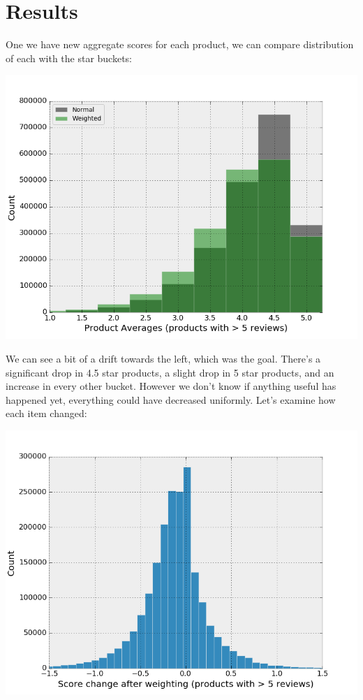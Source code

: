 \documentclass[a4paper,10pt]{article}
\begin{document}
\section*{Results}
One we have new aggregate scores for each product, we can compare distribution of each with the star buckets:
\begin{center}
    \includegraphics[scale=0.65]{normascore_vs_regular.png}
\end{center}

We can see a bit of a drift towards the left, which was the goal. There's a significant drop in 4.5 star products, a slight drop in 5 star products, and an increase in every other bucket. However we don't know if anything useful has happened yet, everything could have decreased uniformly. Let's examine how each item changed:

\begin{center}
    \includegraphics[scale=0.5]{normascore_changes.png}
\end{center}
\end{document}
